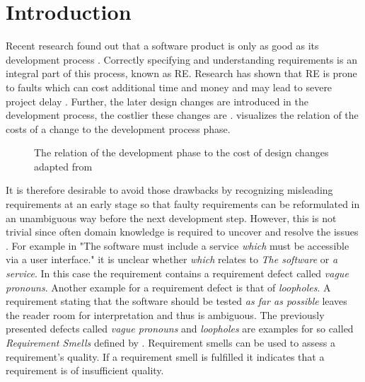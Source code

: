 
\chapter{Introduction}
\label{chp:introduction}

Recent research found out that a software product is only as good as its development process \parencite{Hsia:1993}.
Correctly specifying and understanding requirements is an integral part of this process, known as \ac{RE}.
Research has shown that \ac{RE} is prone to faults which can cost additional time and money \parencite{Mendez:2016} and may lead to severe project delay \parencite{Femmer:2014}.
Further, the later design changes are introduced in the development process, the costlier these changes are \parencite{Folkestad:2001}.
 visualizes the relation of the costs of a change to the development process phase.
\begin{figure}[htpb]
    \centering
    \def\svgwidth{\columnwidth}
    
    \caption[Relation of Development Phase to Cost per Change]{The relation of the development phase to the cost of design changes adapted from \textcite{Folkestad:2001}}\label{fig:introduction:relation}
\end{figure}

It is therefore desirable to avoid those drawbacks by recognizing misleading requirements at an early stage so that faulty requirements can be reformulated in an unambiguous way before the next development step.
However, this is not trivial since often domain knowledge is required to uncover and resolve the issues \parencite{Femmer:2017}.
For example in "The software must include a service \textit{which} must be accessible via a user interface." it is unclear whether \textit{which} relates to \textit{The software} or \textit{a service}.
In this case the requirement contains a requirement defect called \textit{vague pronouns}.
Another example for a requirement defect is that of \textit{loopholes}.
A requirement stating that the software should be tested \textit{as far as possible} leaves the reader room for interpretation and thus is ambiguous.
The previously presented defects called \textit{vague pronouns} and \textit{loopholes} are examples for so called \textit{Requirement Smells} defined by \textcite{Femmer:2017}.
Requirement smells can be used to assess a requirement's quality.
If a requirement smell is fulfilled it indicates that a requirement is of insufficient quality.

